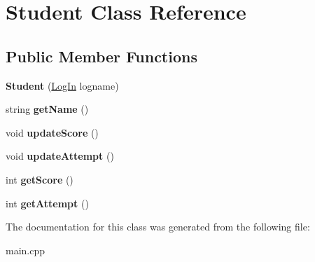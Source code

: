 \hypertarget{class_student}{}\section{Student Class Reference}
\label{class_student}
\subsection*{Public Member Functions}
\begin{DoxyCompactItemize}
\item 
\hypertarget{class_student_a69e42ce4501a2251f4bdacfaa4a5d6ad}{}{\bfseries Student} (\hyperlink{class_log_in}{Log\+In} logname)\label{class_student_a69e42ce4501a2251f4bdacfaa4a5d6ad}

\item 
\hypertarget{class_student_abd89cc79098d40204e387e2b57b15716}{}string {\bfseries get\+Name} ()\label{class_student_abd89cc79098d40204e387e2b57b15716}

\item 
\hypertarget{class_student_a8d0d7cd6ab6d47c5e23b261fca3f18ac}{}void {\bfseries update\+Score} ()\label{class_student_a8d0d7cd6ab6d47c5e23b261fca3f18ac}

\item 
\hypertarget{class_student_a0fbad94dcc97bb590b95dbd4414bce1d}{}void {\bfseries update\+Attempt} ()\label{class_student_a0fbad94dcc97bb590b95dbd4414bce1d}

\item 
\hypertarget{class_student_a958a774d0dab1d8b4c2a55b797a34638}{}int {\bfseries get\+Score} ()\label{class_student_a958a774d0dab1d8b4c2a55b797a34638}

\item 
\hypertarget{class_student_a1faa078d008dac9d547e1e4ba226c02d}{}int {\bfseries get\+Attempt} ()\label{class_student_a1faa078d008dac9d547e1e4ba226c02d}

\end{DoxyCompactItemize}


The documentation for this class was generated from the following file\+:\begin{DoxyCompactItemize}
\item 
main.\+cpp\end{DoxyCompactItemize}

